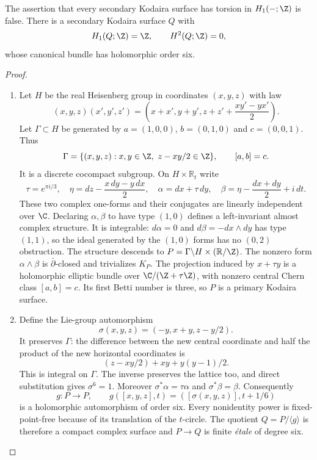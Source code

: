 \begin{proposition}\hypertarget{tag-01F8}{}\label{cdp:st:C.3.2}


The assertion that every secondary Kodaira surface has torsion in
$H_1(-;\Z)$ is false. There is a secondary Kodaira surface $Q$ with
\[
H_1(Q;\Z)=\Z,\qquad H^2(Q;\Z)=0,
\]
whose canonical bundle has holomorphic order six.
\end{proposition}


\begin{proof}

\begin{enumerate}[label={$\langle1\rangle$\arabic*.},leftmargin=*]
\item Let $H$ be the real Heisenberg group in coordinates $(x,y,z)$ with law
\[
(x,y,z)(x',y',z')
=\left(x+x',y+y',z+z'+\frac{xy'-yx'}2\right).
\]
Let $\Gamma\subset H$ be generated by
$a=(1,0,0)$, $b=(0,1,0)$ and $c=(0,0,1)$. Thus
\[
\Gamma=\{(x,y,z):x,y\in\Z,\ z-xy/2\in\Z\},
\qquad [a,b]=c.
\]
It is a discrete cocompact subgroup. On $H\times\mathbb R_t$ write
\[
\tau=e^{\pi i/3},\quad
\eta=dz-\frac{x\,dy-y\,dx}{2},\quad
\alpha=dx+\tau\,dy,\quad
\beta=\eta-\frac{dx+dy}{2}+i\,dt.
\]
These two complex one-forms and their conjugates are linearly
independent over $\C$. Declaring $\alpha,\beta$ to have type $(1,0)$
defines a left-invariant almost complex structure. It is integrable:
$d\alpha=0$ and $d\beta=-dx\wedge dy$ has type $(1,1)$, so the
ideal generated by the $(1,0)$ forms has no $(0,2)$ obstruction.
The structure descends to
$P=\Gamma\backslash H\times(\mathbb R/\Z)$.
The nonzero form $\alpha\wedge\beta$ is $\bar\partial$-closed and
trivializes $K_P$. The projection induced by $x+\tau y$ is a
holomorphic elliptic bundle over $\C/(\Z+\tau\Z)$, with nonzero
central Chern class $[a,b]=c$. Its first Betti number is three, so
$P$ is a primary Kodaira surface.

\item Define the Lie-group automorphism
\[
\sigma(x,y,z)=(-y,x+y,z-y/2).
\]
It preserves $\Gamma$: the difference between the new central
coordinate and half the product of the new horizontal coordinates
is
\[
(z-xy/2)+xy+y(y-1)/2.
\]
This is integral on $\Gamma$. The inverse preserves the lattice too,
and direct substitution gives $\sigma^6=1$. Moreover
$\sigma^*\alpha=\tau\alpha$ and $\sigma^*\beta=\beta$.
Consequently
\[
g:P\longrightarrow P,\qquad
g([x,y,z],t)=([\sigma(x,y,z)],t+1/6)
\]
is a holomorphic automorphism of order six. Every nonidentity power
is fixed-point-free because of its translation of the $t$-circle.
The quotient $Q=P/\langle g\rangle$ is therefore a compact complex
surface and $P\to Q$ is finite \emph{\'etale} of degree six.


\end{enumerate}
\end{proof}
